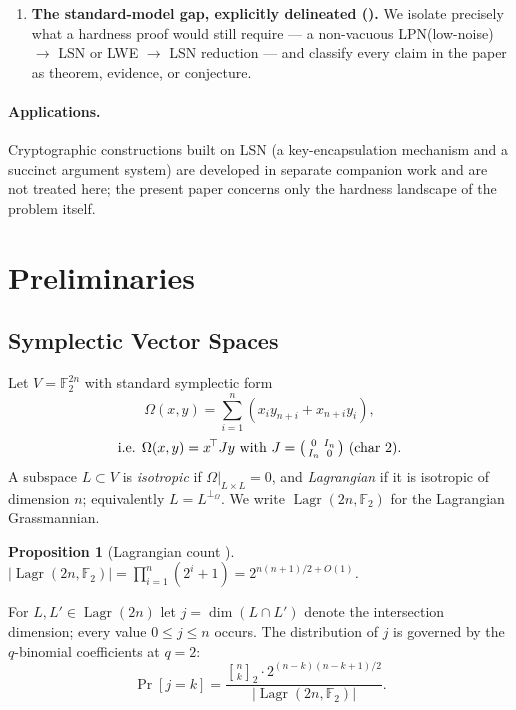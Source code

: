\documentclass[11pt,a4paper]{article}
\theoremstyle{plain}
\newtheorem{proposition}[theorem]{Proposition}
\theoremstyle{definition}
\newcommand{\F}{\mathbb{F}}
\DeclareMathOperator{\Lagr}{Lagr}
\begin{document}
\begin{enumerate}
    \item \textbf{The standard-model gap, explicitly delineated ().} We isolate precisely what a hardness proof would still require --- a non-vacuous LPN(low-noise) $\to$ LSN or LWE $\to$ LSN reduction --- and classify every claim in the paper as theorem, evidence, or conjecture.
\end{enumerate}

\paragraph{Applications.} Cryptographic constructions built on LSN (a key-encapsulation mechanism and a succinct argument system) are developed in separate companion work and are not treated here; the present paper concerns only the hardness landscape of the problem itself.

\section{Preliminaries}
\label{sec:prelim}

\subsection{Symplectic Vector Spaces}
\label{subsec:symplectic}

Let $V = \F_2^{2n}$ with standard symplectic form
\[
\Omega(x,y) = \sum_{i=1}^n (x_i y_{n+i} + x_{n+i} y_i),
\]
\[
\text{i.e. } \Omega(x,y) = x^{\!\top} J y \text{ with } J = \begin{psmallmatrix} 0 & I_n \\ I_n & 0 \end{psmallmatrix} \text{ (char 2)}.
\]
A subspace $L \subset V$ is \emph{isotropic} if $\Omega|_{L \times L} = 0$, and \emph{Lagrangian} if it is isotropic of dimension $n$; equivalently $L = L^{\perp_\Omega}$. We write $\Lagr(2n, \F_2)$ for the Lagrangian Grassmannian.

\begin{proposition}[Lagrangian count \cite{Mac71}]
$|\Lagr(2n, \F_2)| = \prod_{i=1}^n (2^i + 1) = 2^{n(n+1)/2 + O(1)}$.
\end{proposition}

For $L, L' \in \Lagr(2n)$ let $j = \dim(L \cap L')$ denote the intersection dimension; every value $0 \le j \le n$ occurs. The distribution of $j$ is governed by the $q$-binomial coefficients at $q=2$:
\begin{equation}
\label{eq:j-distribution}
\Pr[j=k] = \frac{{n \brack k}_2 \cdot 2^{(n-k)(n-k+1)/2}}{|\Lagr(2n,\F_2)|}.
\end{equation}
\end{document}
